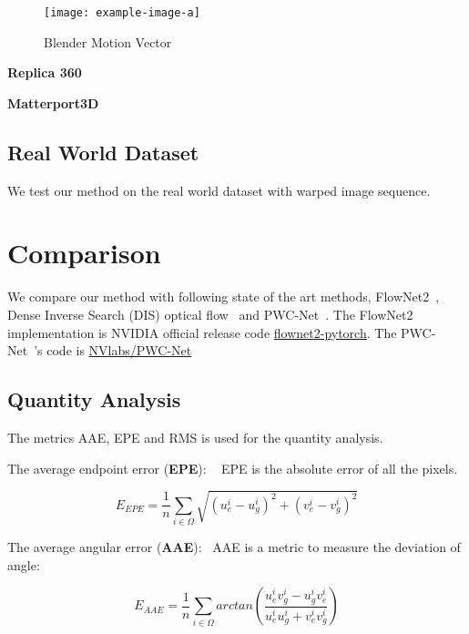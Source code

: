 \begin{figure}[hbt!]
	\centering
	\texttt{[image: example-image-a]}
	\caption{Blender Motion Vector}
	\label{fig:exp:blendermv}
\end{figure}

\textbf{Replica 360} ~\citet{replica19arxiv}



\textbf{Matterport3D} ~\citet{Matterport3D}


\subsection{Real World Dataset}

We test our method on the real world dataset with warped image sequence.

\section{Comparison}

We compare our method with following state of the art methods, FlowNet2~\cite{ilg2017flownet}, Dense Inverse Search (DIS) optical flow~\cite{kroeger2016fast} and PWC-Net~\cite{sun2018pwc}. 
The FlowNet2~\cite{ilg2017flownet} implementation is NVIDIA official release code \href{https://github.com/NVIDIA/flownet2-pytorch}{flownet2-pytorch}.
The PWC-Net~\cite{sun2018pwc}'s code is \href{https://github.com/NVlabs/PWC-Net}{NVlabs/PWC-Net}

\subsection{Quantity Analysis}

The metrics AAE, EPE and RMS is used for the quantity analysis.

The average endpoint error (\textbf{EPE}):  ~\cite{??}
EPE is the absolute error of all the pixels. 

\begin{equation}\label{equ_exp_epe}
E_{EPE} = \frac{1}{n} \sum_{i \in \Omega}\sqrt{(u_e^i - u_g^i)^2 + (v_e^i - v_g^i)^2}
\end{equation}

The average angular error (\textbf{AAE}):~\cite{??}
AAE is a metric to measure the deviation of angle:

\begin{equation}\label{equ_exp_aae}
	E_{AAE} = \frac{1}{n} \sum_{i \in \Omega}arctan(\frac{u^i_e v^i_g - u^i_g v^i_e}{u^i_e u^i_g + v^i_e v^i_g})
\end{equation}

